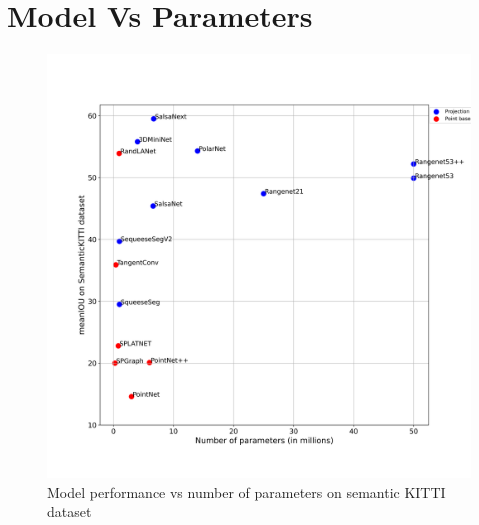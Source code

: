 \documentclass[12pt]{article}
\begin{document}
\section{Model Vs Parameters}
\begin{figure}[h!]
    \centering
    \includegraphics[scale=0.65]{theme/images/models_new.png}
    \caption{Model performance vs number of parameters on semantic KITTI dataset}
    \label{fig:my_label}
\end{figure}
%     


\newpage

\nocite{*}


\end{document}
